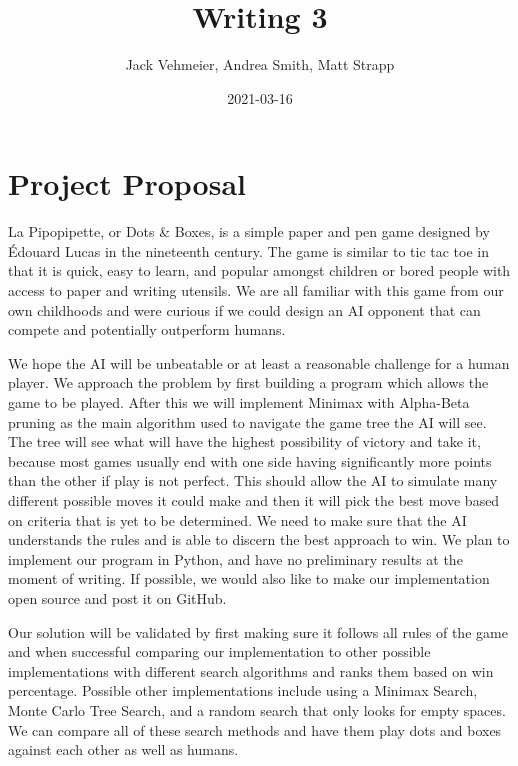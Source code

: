 \documentclass{article}
\title{Writing 3}
\author{Jack Vehmeier, Andrea Smith, Matt Strapp}
\date{2021-03-16}
\begin{document}
   \maketitle
   \section*{Project Proposal}
La Pipopipette, or Dots \& Boxes, is a simple paper and pen game designed by Édouard Lucas in the nineteenth century.
The game is similar to tic tac toe in that it is quick, easy to learn, and popular amongst children or bored people with access to paper and writing utensils.
We are all familiar with this game from our own childhoods and were curious if we could design an AI opponent that can compete and potentially outperform humans.


We hope the AI will be unbeatable or at least a reasonable challenge for a human player.
We approach the problem by first building a program which allows the game to be played.
After this we will implement Minimax with Alpha-Beta pruning as the main algorithm used to navigate the game tree the AI will see.
The tree will see what will have the highest possibility of victory and take it, because most games usually end with one side having significantly more points than the other if play is not perfect.
This should allow the AI to simulate many different possible moves it could make and then it will pick the best move based on criteria that is yet to be determined.
We need to make sure that the AI understands the rules and is able to discern the best approach to win.
We plan to implement our program in Python, and have no preliminary results at the moment of writing.
If possible, we would also like to make our implementation open source and post it on GitHub.


Our solution will be validated by first making sure it follows all rules of the game and when successful comparing our implementation to other possible implementations with different search algorithms and ranks them based on win percentage.
Possible other implementations include using a Minimax Search, Monte Carlo Tree Search, and a random search that only looks for empty spaces.
We can compare all of these search methods and have them play dots and boxes against each other as well as humans.
\end{document}
